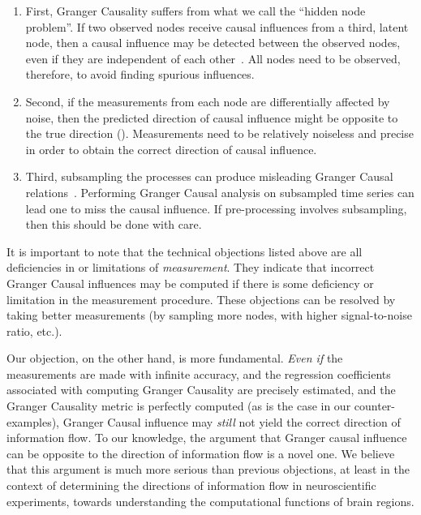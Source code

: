 \documentclass[letterpaper, 10pt, conference]{ieeeconf}
\begin{document}
\begin{enumerate}
	\item First, Granger Causality suffers from what we call the ``hidden node problem''. If two observed nodes receive causal influences from a third, latent node, then a causal influence may be detected between the observed nodes, even if they are independent of each other~\cite{pearl2009causality-hidden-node}. All nodes need to be observed, therefore, to avoid finding spurious influences.
	\item Second, if the measurements from each node are differentially affected by noise, then the predicted direction of causal influence might be opposite to the true direction (\cite{nalatore2007mitigating,andersson2005testing}). Measurements need to be relatively noiseless and precise in order to obtain the correct direction of causal influence.
	\item Third, subsampling the processes can produce misleading Granger Causal relations~\cite{gong2015discovering}. Performing Granger Causal analysis on subsampled time series can lead one to miss the causal influence. If pre-processing involves subsampling, then this should be done with care.
\end{enumerate}

It is important to note that the technical objections listed above are all deficiencies in or limitations of \emph{measurement}. They indicate that incorrect Granger Causal influences may be computed if there is some deficiency or limitation in the measurement procedure. These objections can be resolved by taking better measurements (by sampling more nodes, with higher signal-to-noise ratio, etc.).

Our objection, on the other hand, is more fundamental. \emph{Even if} the measurements are made with infinite accuracy, and the regression coefficients associated with computing Granger Causality are precisely estimated, and the Granger Causality metric is perfectly computed (as is the case in our counter-examples), Granger Causal influence may \emph{still} not yield the correct direction of information flow. To our knowledge, the argument that Granger causal influence can be opposite to the direction of information flow is a novel one. We believe that this argument is much more serious than previous objections, at least in the context of determining the directions of information flow in neuroscientific experiments, towards understanding the computational functions of brain regions.

\end{document}
